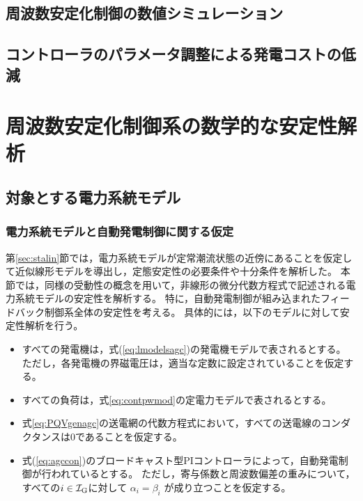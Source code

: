 \documentclass[tombow,dvipdfmx]{corona-a5-1.1}
\begin{document}
\subsection{周波数安定化制御の数値シミュレーション}



\subsection{コントローラのパラメータ調整による発電コストの低減}\label{sec:conpeco}




\section{周波数安定化制御系の数学的な安定性解析\advanced}

\subsection{対象とする電力系統モデル\advanced}\label{sec:objmod}

\subsubsection{電力系統モデルと自動発電制御に関する仮定}

第\ref{sec:stalin}節では，電力系統モデルが定常潮流状態の近傍にあることを仮定して近似線形モデルを導出し，定態安定性の必要条件や十分条件を解析した。
本節では，同様の受動性の概念を用いて，非線形の微分代数方程式で記述される電力系統モデルの安定性を解析する。
特に，自動発電制御が組み込まれたフィードバック制御系全体の安定性を考える。
具体的には，以下のモデルに対して安定性解析を行う。
\begin{itemize}
\item すべての発電機は，式(\ref{eq:lmodelsagc})の発電機モデルで表されるとする。
ただし，各発電機の界磁電圧は，適当な定数に設定されていることを仮定する。
\item すべての負荷は，式\ref{eq:contpwmod}の定電力モデルで表されるとする。
\item 式\ref{eq:PQVgenagc}の送電網の代数方程式において，すべての送電線のコンダクタンスは0であることを仮定する。
\item 式(\ref{eq:agccon})のブロードキャスト型PIコントローラによって，自動発電制御が行われているとする。
ただし，寄与係数と周波数偏差の重みについて，すべての$i\in \mathcal{I}_{\rm G}$に対して
$\alpha_i = \beta_i $
が成り立つことを仮定する。
\end{itemize}
\end{document}
